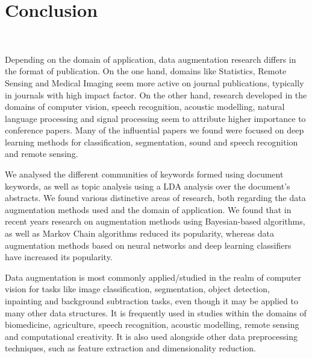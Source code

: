 \documentclass[parskip=full]{scrartcl}
\begin{document}
\section{Conclusion}~\label{sec:conclusion}

Depending on the domain of application, data augmentation research differs in
the format of publication. On the one hand, domains like Statistics, Remote
Sensing and Medical Imaging seem more active on journal publications,
typically in journals with high impact factor. On the other hand, research
developed in the domains of computer vision, speech recognition, acoustic
modelling, natural language processing and signal processing seem to attribute
higher importance to conference papers. Many of the influential papers we found
were focused on deep learning methods for classification, segmentation, sound
and speech recognition and remote sensing.

We analysed the different communities of keywords formed using document
keywords, as well as topic analysis using a LDA analysis over the document's
abstracts. We found various distinctive areas of research, both regarding the
data augmentation methods used and the domain of application. We found that in
recent years research on augmentation methods using Bayesian-based algorithms,
as well as Markov Chain algorithms reduced its popularity, whereas data
augmentation methods based on neural networks and deep learning classifiers
have increased its popularity.

Data augmentation is most commonly applied/studied in the realm of computer
vision for tasks like image classification, segmentation, object detection,
inpainting and background subtraction tasks, even though it may be applied to
many other data structures. It is frequently used in studies within the
domains of biomedicine, agriculture, speech recognition, acoustic modelling,
remote sensing and computational creativity. It is also used alongside other
data preprocessing techniques, such as feature extraction and dimensionality
reduction.
\end{document}
